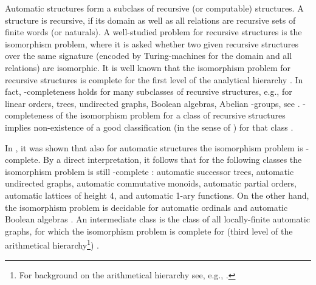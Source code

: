 \documentclass[envcountsame]{llncs}
\begin{document}
Automatic structures form a subclass of recursive (or computable) structures.
A structure is recursive, if its domain as well as all relations are recursive
sets of finite words (or naturals). A well-studied problem for
recursive structures is the isomorphism problem, where it is asked whether
two given recursive structures over the same signature
(encoded by Turing-machines for the domain
and all relations) are isomorphic. It is well known that the isomorphism
problem for recursive structures is complete for the first level of the analytical hierarchy
. In fact, -completeness holds for many subclasses
of recursive structures, e.g., for linear orders, trees, undirected graphs, Boolean
algebras, Abelian -groups, see \cite{CaKni06,GonKn02}.
-completeness of the isomorphism problem for a class of recursive
structures implies non-existence of a good classification
(in the sense of \cite{CaKni06}) for that class \cite{CaKni06}.

In \cite{KhoNRS07}, it was shown that also for automatic structures the
isomorphism problem is -complete. By a direct interpretation,
it follows that for the following classes the isomorphism problem is
still -complete \cite{Nie07}: automatic successor trees, automatic undirected
graphs, automatic commutative monoids, automatic partial orders, automatic
lattices of height 4, and automatic 1-ary functions.
On the other hand, the isomorphism problem is decidable for automatic ordinals
\cite{KhoRS05} and automatic Boolean algebras \cite{KhoNRS07}.
An intermediate class is the class of all locally-finite automatic graphs, for
which the isomorphism problem is complete for  (third level
of the arithmetical hierarchy\footnote{For background on the arithmetical 
hierarchy see, e.g., \cite{Rogers}.}) \cite{Rub04}.
\end{document}
